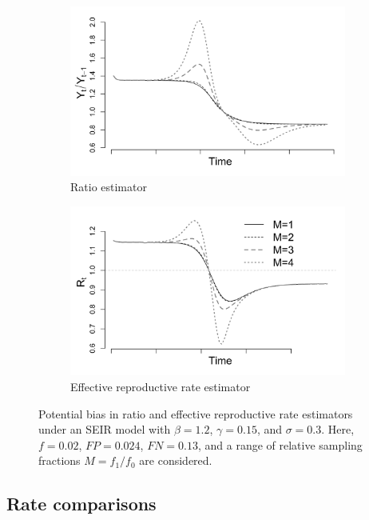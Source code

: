 \documentclass[11pt]{amsart}
\numberwithin{equation}{section}
\theoremstyle{plain}
\begin{document}
 \begin{figure}
 \centering
 \begin{subfigure}{.5\textwidth}
  \centering
  \includegraphics[width=.9\linewidth]{../figs/seir_ratio.png}
  \caption{Ratio estimator}
  \label{fig:ratio-bias}
 \end{subfigure}%
 \begin{subfigure}{.5\textwidth}
  \centering
  \includegraphics[width=.9\linewidth]{../figs/seir_rt.png}
  \caption{Effective reproductive rate estimator}
  \label{fig:r0-bias}
 \end{subfigure}
 \caption{Potential bias in ratio and effective reproductive rate estimators under an SEIR model with $\beta = 1.2$, $\gamma = 0.15$, and $\sigma = 0.3$.  Here, $f = 0.02$, $FP = 0.024$, $FN = 0.13$, and a range of relative sampling fractions $M = f_1/f_0$ are considered.}
 \label{fig:rates}
 \end{figure}

 \subsection{Rate comparisons}
\end{document}
